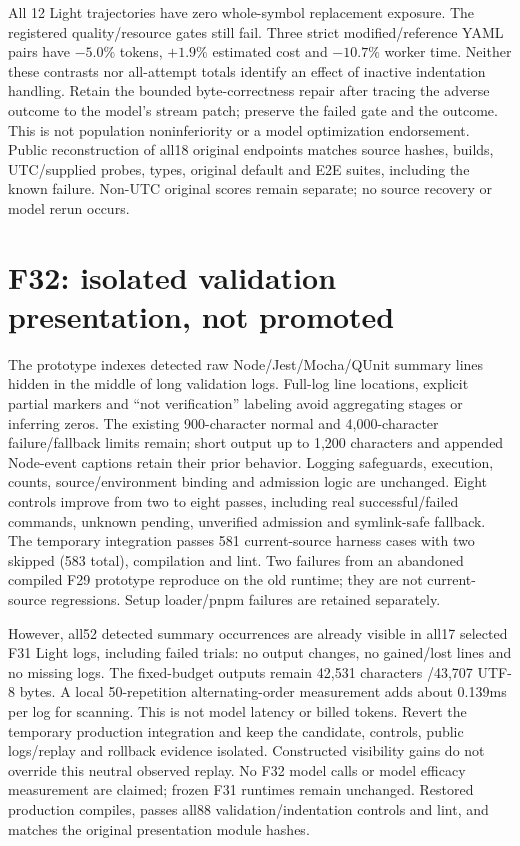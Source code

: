\documentclass[11pt,a4paper]{article}
\newcommand{\code}[1]{\texttt{\detokenize{#1}}}
\begin{document}
All 12 Light trajectories have zero whole-symbol replacement exposure. The
registered quality/resource gates still fail. Three strict modified/reference
YAML pairs have $-5.0\%$ tokens,
$+1.9\%$ estimated cost and $-10.7\%$ worker time. Neither these contrasts nor
all-attempt totals identify an effect of inactive indentation handling.
Retain the bounded byte-correctness repair after tracing the adverse outcome to
the model's stream patch; preserve the failed gate and the outcome. This is not
population noninferiority or a model optimization endorsement.
Public reconstruction of all18 original endpoints matches source hashes, builds,
UTC/supplied probes, types, original default and E2E suites, including the known
failure. Non-UTC original scores remain separate; no source recovery or model
rerun occurs.

\section{F32: isolated validation presentation, not promoted}
The prototype indexes detected raw Node/Jest/Mocha/QUnit summary
lines hidden in the middle of long validation logs. Full-log line locations,
explicit partial markers and ``not verification'' labeling avoid aggregating
stages or inferring zeros. The existing 900-character normal and 4,000-character
failure/fallback limits remain; short output up to 1,200 characters and appended
Node-event captions retain their prior behavior. Logging safeguards, execution,
counts, source/environment binding and admission logic are unchanged.
Eight controls improve from two to eight passes, including real successful/failed
commands, unknown pending, unverified admission and symlink-safe fallback.
The temporary integration passes 581 current-source harness cases with two
skipped (583 total), compilation and lint. Two failures from an abandoned compiled
F29 prototype reproduce on the old runtime; they are not current-source regressions.
Setup loader/pnpm failures are retained separately.

However, all52 detected summary occurrences are already visible in all17 selected
F31 Light logs, including failed trials: no output changes, no gained/lost lines
and no missing logs. The fixed-budget outputs remain 42,531 characters /43,707
UTF-8 bytes. A local 50-repetition alternating-order \code{process.cpuUsage}
measurement adds about 0.139ms per log for scanning. This is not model latency or
billed tokens. Revert the temporary production integration and keep the candidate,
controls, public logs/replay and rollback evidence isolated. Constructed visibility
gains do not override this neutral observed replay. No F32 model calls or model
efficacy measurement are claimed; frozen F31 runtimes remain unchanged.
Restored production compiles, passes all88 validation/indentation controls and
lint, and matches the original presentation module hashes.
\end{document}
